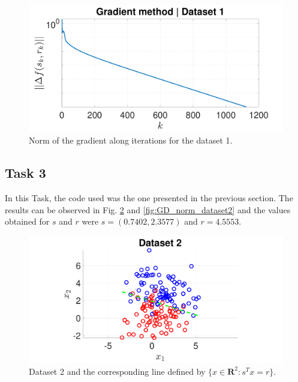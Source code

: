 \documentclass[12pt]{article}
\begin{document}
\begin{figure}[ht!]
    \centering
    \includegraphics[width=\textwidth]{figures/GDNormGradDataset1.pdf}
    \caption{Norm of the gradient along iterations for the dataset 1.}
    \label{fig:GD_norm_dataset1}
\end{figure}

\subsection{Task 3}

In this Task, the code used was the one presented in the previous section. The results can be observed in Fig. \ref{fig:GD_dataset2} and \ref{fig:GD_norm_dataset2} and the values obtained for $s$ and $r$ were $s = (0.7402,2.3577)$ and $r=4.5553$.

\begin{figure}[ht!]
    \centering
    \includegraphics[width=\textwidth]{figures/GDsolDataset2.pdf}
    \caption{Dataset 2 and the corresponding line defined by $\{ x \in \mathbf{R}^2: s^T x = r\}$.}
    \label{fig:GD_dataset2}
\end{figure}
\end{document}
